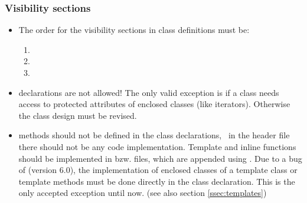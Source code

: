 \subsubsection{Visibility sections}
\label{sssec:sichtbarkeit}
\begin{itemize}
\item The order for the visibility sections in class definitions must be:
\begin{enumerate}
\item {}
\item {}
\item {}
\end{enumerate}
\item {} declarations are not allowed!  The only valid exception is
  if a class needs access to protected attributes of enclosed classes (like
  iterators).  Otherwise the class design must be revised.
\item methods should not be defined in the class declarations, \ie\ in the
  header file there should not be any code implementation.  Template and inline
  functions should be implemented in 
  bzw.  files, which are appended using .
  Due to a bug of \visualc (version 6.0), the implementation of enclosed
  classes of a template class or template methods must be done directly in the
  class declaration.  This is the only accepted exception until now.
  (see also section \ref{ssec:templates})
\end{itemize}


